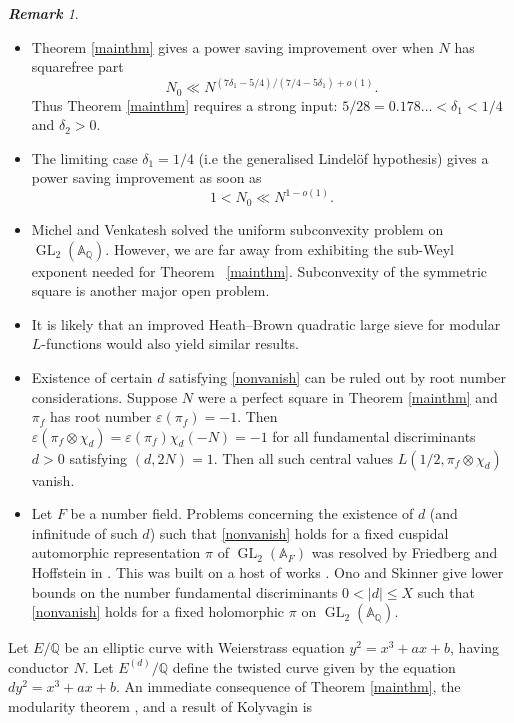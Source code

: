 \documentclass[12pt,reqno]{amsart}
\theoremstyle{plain}
\theoremstyle{remark}
\newtheorem*{remark*}{\bf Remark}
\numberwithin{equation}{section}
\numberwithin{lemma}{section}
\numberwithin{theorem}{section}
\numberwithin{prop}{section}
\numberwithin{remark}{section}
\begin{document}
\begin{remark*}
~\begin{itemize}
\item Theorem \ref{mainthm} gives a power saving improvement over \cite{HK} when $N$ has 
squarefree part 
\begin{equation*}
N_0 \ll N^{(7 \delta_1-5/4)/(7/4-5 \delta_1)+o(1)}.
\end{equation*}
Thus Theorem \ref{mainthm} requires a strong input: $5/28=0.178 \ldots<\delta_1<1/4$ and $\delta_2>0$.
\item The limiting case $\delta_1=1/4$ (i.e the generalised Lindel\"{o}f hypothesis)
gives a power saving improvement as soon as 
\begin{equation*}
1<N_0 \ll N^{1-o(1)}.
\end{equation*}
\item Michel and Venkatesh \cite{MV} solved the uniform subconvexity problem on 
$\operatorname{GL}_2(\mathbb{A}_{\mathbb{Q}})$. However, we are far away from exhibiting the 
sub-Weyl exponent needed for Theorem ~\ref{mainthm}. Subconvexity of the symmetric square is another
major open problem.
\item It is likely that an improved Heath--Brown quadratic large sieve \cite{HB}
 for modular $L$-functions would also yield similar results.
\item Existence of certain $d$ satisfying \eqref{nonvanish} can be ruled out by root number considerations.
Suppose $N$ were a perfect square in Theorem \ref{mainthm} and $\pi_f$ has root number $\varepsilon(\pi_f)=-1$.
Then $\varepsilon(\pi_f \otimes \chi_d)=\varepsilon(\pi_f) \chi_d(-N)=-1$ for all fundamental discriminants $d>0$ satisfying $(d,2N)=1$.
Then all such central values $L(1/2, \pi_f \otimes \chi_d)$ vanish.
\item Let $F$ be a number field. Problems concerning the existence of $d$ (and infinitude of such $d$) 
such that \eqref{nonvanish} holds for a fixed cuspidal automorphic representation $\pi$ of
$\operatorname{GL}_2(\mathbb{A}_F)$ was resolved by Friedberg and Hoffstein in \cite{FH}.
This was built on a host of works \cite{BFH1,BFH2,Iw,MM}. Ono and Skinner \cite{OS} 
give lower bounds on the number fundamental discriminants $0<|d| \leq X$ such that \eqref{nonvanish}
holds for a fixed holomorphic $\pi$ on $\operatorname{GL}_2(\mathbb{A}_{\mathbb{Q}})$.
\end{itemize}
\end{remark*}

Let $E/\mathbb{Q}$ be an elliptic curve with Weierstrass equation 
$y^2=x^3+ax+b$, having conductor $N$. Let $E^{(d)}/\mathbb{Q}$ 
define the twisted curve given by the equation
$dy^2=x^3+ax+b$. An immediate consequence of Theorem \ref{mainthm}, the
modularity theorem \cite{BCDT}, and a result of Kolyvagin \cite{KVA} is
\end{document}
